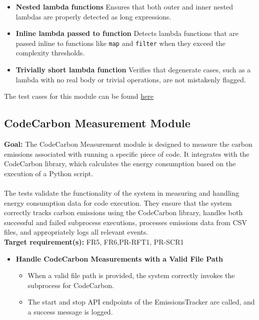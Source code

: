 \documentclass[12pt, titlepage]{article}
\begin{document}
\begin{enumerate}[label={\bf \textcolor{Maroon}{test-SRT-\arabic*}}, wide=0pt, font=\itshape]
\begin{itemize}
    \item \textbf{Nested lambda functions} \newline
    Ensures that both outer and inner nested lambdas are properly detected as long expressions.

    \item \textbf{Inline lambda passed to function} \newline
    Detects lambda functions that are passed inline to functions like \texttt{map} and \texttt{filter} when they exceed the complexity thresholds.

    \item \textbf{Trivially short lambda function} \newline
    Verifies that degenerate cases, such as a lambda with no real body or trivial operations, are not mistakenly flagged.
\end{itemize}

\noindent The test cases for this module can be found \href{https://github.com/ssm-lab/capstone--source-code-optimizer/blob/new-poc/tests/analyzers/test_long_lambda_element.py}{here}

\subsection{CodeCarbon Measurement Module}
\textbf{Goal:} The CodeCarbon Measurement module is designed to measure the carbon emissions associated with running a specific piece of code. It integrates with the CodeCarbon library, which calculates the energy consumption based on the execution of a Python script.\\ \\
\noindent The tests validate the functionality of the system in measuring and handling energy consumption data for code execution. They ensure that the system correctly tracks carbon emissions using the CodeCarbon library, handles both successful and failed subprocess executions, processes emissions data from CSV files, and appropriately logs all relevant events.\\

\noindent \textbf{Target requirement(s):} FR5, FR6,PR-RFT1, PR-SCR1~\cite{SRS} \\

\begin{itemize}
    \item \textbf{Handle CodeCarbon Measurements with a Valid File Path}
    \begin{itemize}
        \item When a valid file path is provided, the system correctly invokes the subprocess for CodeCarbon.
        \item The start and stop API endpoints of the EmissionsTracker are called, and a success message is logged.
    \end{itemize}


\end{itemize}
\end{enumerate}
\end{document}
